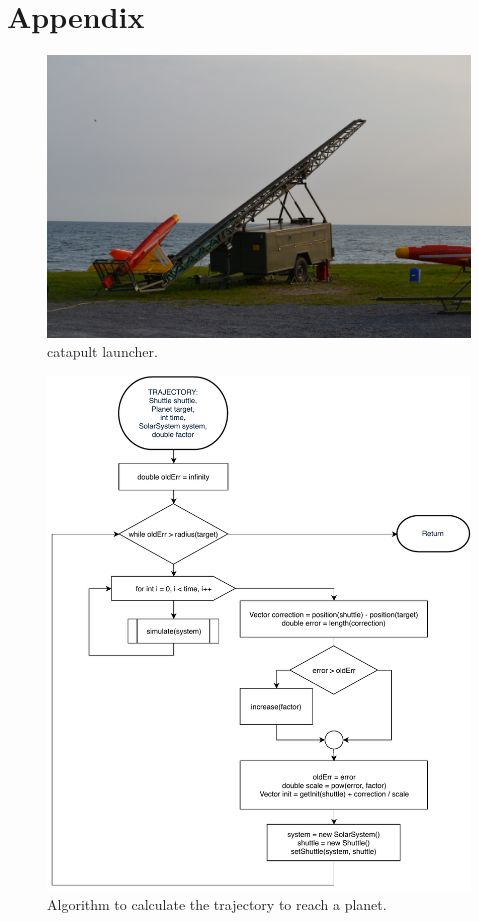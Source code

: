 \documentclass[10pt,a4paper]{article}
\begin{document}
	\newpage
	
	\section*{Appendix}
	\begin{figure}[h]
		\centering
		\includegraphics[width=1\linewidth]{kec-launcher.jpg}
		\caption[Short]{catapult launcher.}
		\label{fig:catapult}
	\end{figure}
	
	\begin{figure}[h]
		\centering
		\includegraphics[width=1\linewidth]{trajectory}
		\caption[Short]{Algorithm to calculate the trajectory to reach a planet.}
		\label{fig:trajectory}
	\end{figure}
	
\end{document}

